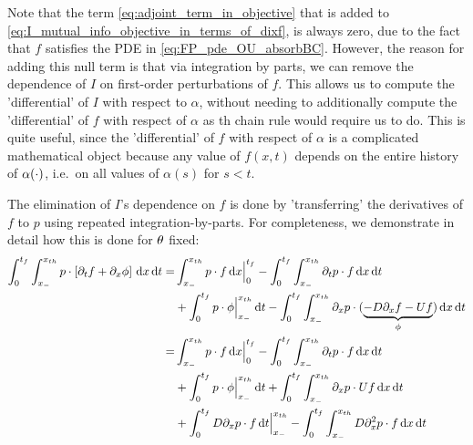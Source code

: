 Note that the term \cref{eq:adjoint_term_in_objective} that is added to
\cref{eq:I_mutual_info_objective_in_terms_of_dixf}, is always zero, due to the
fact that $f$ satisfies the PDE in \cref{eq:FP_pde_OU_absorbBC}. However, the
reason for adding this null term is that via integration by parts, we can
remove the dependence of $I$ on first-order perturbations of $f$. This allows us to
compute the 'differential' of $I$ with respect to $\alpha$, without needing to
additionally compute the 'differential' of $f$ with respect of $\alpha$ as th
chain rule would require us to do. This is quite useful, since the
'differential' of $f$ with respect of $\alpha$ is a complicated mathematical
object because any value of $f(x,t)$ depends on the entire history of
$\alpha(\cdot)$, i.e.\ on all values of $\alpha(s)$ for $s<t$.

The elimination of $I$'s dependence on $f$ is done by 'transferring' the
derivatives of $f$ to $p$ using repeated integration-by-parts. For completeness,
we demonstrate in detail how this is done for ${ \theta}$ fixed:
\begin{align*}
\int_0^{{t_f}} \int_{x_-}^{{ x_{th} }}
p \cdot \left[{\partial}_t f  + {\partial}_x \phi\right]
	\, \mathrm{d} x\, \mathrm{d} t 
=& 
\int_{x_-}^{{ x_{th} }} p \cdot f \, \mathrm{d} x \Big|_0^{{t_f}} -
\int_0^{{t_f}}\int_{x_-}^{{ x_{th} }} {\partial}_tp \cdot  f \, \mathrm{d} x\, \mathrm{d} t  
\\
&+ \int_{0}^{{t_f}} p\cdot \phi   \Big|_{x_-}^{{ x_{th} }} \, \mathrm{d} t
-  \int_0^{{t_f}}\int_{x_-}^{{ x_{th} }} {\partial}_xp \cdot  (\underbrace{-D{\partial}_xf - U
f}_{\phi})
\, \mathrm{d} x\, \mathrm{d} t
\\
=&
\int_{x_-}^{{ x_{th} }} p \cdot f \, \mathrm{d} x \Big|_0^{{t_f}} -
\int_0^{{t_f}}\int_{x_-}^{{ x_{th} }} {\partial}_tp \cdot  f \, \mathrm{d} x\, \mathrm{d} t  
\\ 
&+ \int_{0}^{{t_f}} p\cdot \phi \Big|_{x_-}^{{ x_{th} }} \, \mathrm{d} t 
 + \int_0^{{t_f}}\int_{x_-}^{{ x_{th} }} {\partial}_xp \cdot  U f\, \mathrm{d} x\, \mathrm{d} t
\\
&+  
\int_{0}^{{t_f}} D{\partial}_xp\cdot f \, \mathrm{d} t  \Big|_{x_-}^{{ x_{th} }} -
\int_0^{{t_f}}\int_{x_-}^{{ x_{th} }} D{\partial}^2_xp \cdot  f\, \mathrm{d} x\, \mathrm{d} t
\end{align*}

